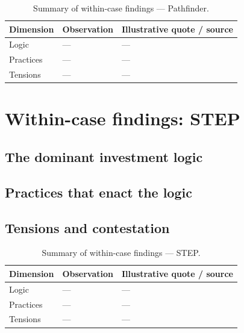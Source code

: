 \begin{table}[H]
\centering
\caption[Pathfinder findings summary]{Summary of within-case findings —
Pathfinder.}
\label{tab:pf-findings}
\begin{tabularx}{\textwidth}{@{} l X X @{}}
\toprule
\textbf{Dimension} & \textbf{Observation} & \textbf{Illustrative quote / source} \\
\midrule
Logic         & --- & --- \\
Practices     & --- & --- \\
Tensions      & --- & --- \\
\bottomrule
\end{tabularx}
\end{table}

\section{Within-case findings: STEP}
\label{sec:res-step}

\subsection{The dominant investment logic}
\label{sec:res-step-logic}

\subsection{Practices that enact the logic}
\label{sec:res-step-practices}

\subsection{Tensions and contestation}
\label{sec:res-step-tensions}

\begin{table}[H]
\centering
\caption[STEP findings summary]{Summary of within-case findings — STEP.}
\label{tab:step-findings}
\begin{tabularx}{\textwidth}{@{} l X X @{}}
\toprule
\textbf{Dimension} & \textbf{Observation} & \textbf{Illustrative quote / source} \\
\midrule
Logic         & --- & --- \\
Practices     & --- & --- \\
Tensions      & --- & --- \\
\bottomrule
\end{tabularx}
\end{table}

